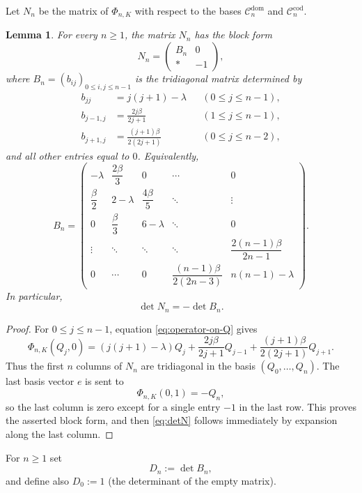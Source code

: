 \documentclass[11pt,letterpaper]{amsart}
\numberwithin{equation}{section}
\theoremstyle{plain}
\newtheorem{lemma}[theorem]{Lemma}
\theoremstyle{remark}
\begin{document}
Let $N_n$ be the matrix of $\Phi_{n,K}$ with respect to the bases $\mathcal C_n^{\mathrm{dom}}$ and $\mathcal C_n^{\mathrm{cod}}$.

\begin{lemma}\label{lem:N-block}
For every $n\ge 1$, the matrix $N_n$ has the block form
\[
 N_n=
 \begin{pmatrix}
  B_n & 0 \\
  * & -1
 \end{pmatrix},
\]
where $B_n=(b_{ij})_{0\le i,j\le n-1}$ is the tridiagonal matrix determined by
\begin{align*}
 b_{jj}&=j(j+1)-\lambda &&(0\le j\le n-1),\\
 b_{j-1,j}&=\frac{2j\beta}{2j+1} &&(1\le j\le n-1),\\
 b_{j+1,j}&=\frac{(j+1)\beta}{2(2j+1)} &&(0\le j\le n-2),
\end{align*}
and all other entries equal to $0$. Equivalently,
\[
 B_n=
 \begin{pmatrix}
 -\lambda & \dfrac{2\beta}{3} & 0 & \cdots & 0 \\
 \dfrac{\beta}{2} & 2-\lambda & \dfrac{4\beta}{5} & \ddots & \vdots \\
 0 & \dfrac{\beta}{3} & 6-\lambda & \ddots & 0 \\
 \vdots & \ddots & \ddots & \ddots & \dfrac{2(n-1)\beta}{2n-1} \\
 0 & \cdots & 0 & \dfrac{(n-1)\beta}{2(2n-3)} & n(n-1)-\lambda
 \end{pmatrix}.
\]
In particular,
\begin{equation}\label{eq:detN}
 \det N_n=-\det B_n.
\end{equation}
\end{lemma}

\begin{proof}
For $0\le j\le n-1$, equation \eqref{eq:operator-on-Q} gives
\[
 \Phi_{n,K}(Q_j,0)
 =(j(j+1)-\lambda)Q_j
 +\frac{2j\beta}{2j+1}Q_{j-1}
 +\frac{(j+1)\beta}{2(2j+1)}Q_{j+1}.
\]
Thus the first $n$ columns of $N_n$ are tridiagonal in the basis $(Q_0,\dots,Q_n)$. The last basis vector $e$ is sent to
\[
 \Phi_{n,K}(0,1)=-Q_n,
\]
so the last column is zero except for a single entry $-1$ in the last row. This proves the asserted block form, and then \eqref{eq:detN} follows immediately by expansion along the last column.
\end{proof}

For $n\ge 1$ set
\[
 D_n:=\det B_n,
\]
and define also $D_0:=1$ (the determinant of the empty matrix).
\end{document}

